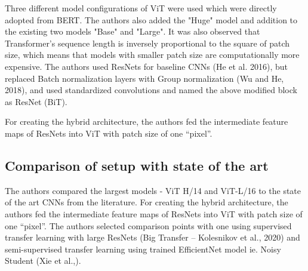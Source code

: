 \documentclass[conference]{IEEEtran}
\begin{document}
Three different model configurations of ViT were used which were directly adopted from BERT. The authors also added the "Huge" model and addition to the existing two models "Base" and "Large".
It was also observed that Transformer's sequence length is inversely proportional to the square of patch size, which means that models with smaller patch size are computationally more expensive.
The authors used ResNets for baseline CNNs (He et al. 2016), but replaced Batch normalization layers with Group normalization (Wu and He, 2018), and used standardized convolutions and named the above modified block as ResNet (BiT). 

For creating the hybrid architecture, the authors fed the intermediate feature maps of ResNets into ViT with patch size of one “pixel”. 



\subsection{Comparison of setup with state of the art}
The authors compared the largest models - ViT H/14 and ViT-L/16 to the state of the art CNNs from the literature. 
For creating the hybrid architecture, the authors fed the intermediate feature maps of ResNets into ViT with patch size of one “pixel”. The authors selected comparison points with one using supervised transfer learning with large ResNets (Big Transfer – Kolesnikov et al., 2020) and semi-supervised transfer learning using trained EfficientNet model ie. Noisy Student (Xie et al.,). 
\end{document}
